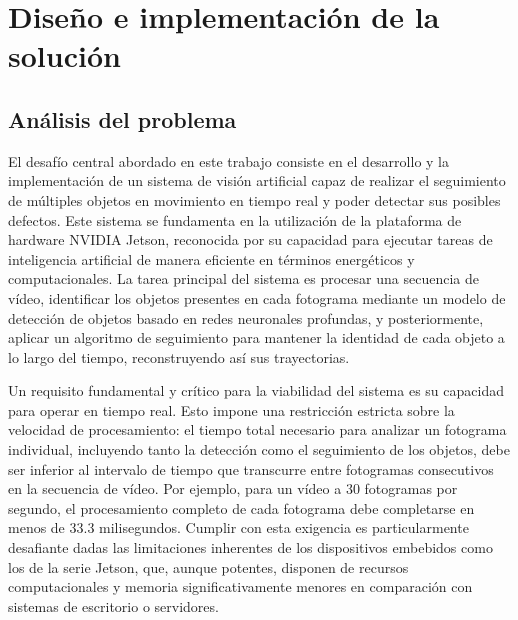 \documentclass[11pt,spanish,listoffigures,listoftables]{tfgetsinf}
\begin{document}




\chapter{Diseño e implementación de la solución} \label{chap:diseno_e_implementacion}

\section{Análisis del problema} \label{sec:analisis_problema}

El desafío central abordado en este trabajo consiste en el desarrollo y la implementación de un sistema de visión artificial capaz de realizar el seguimiento de múltiples objetos en movimiento en tiempo real y poder detectar sus posibles defectos. Este sistema se fundamenta en la utilización de la plataforma de hardware NVIDIA Jetson, reconocida por su capacidad para ejecutar tareas de inteligencia artificial de manera eficiente en términos energéticos y computacionales. La tarea principal del sistema es procesar una secuencia de vídeo, identificar los objetos presentes en cada fotograma mediante un modelo de detección de objetos basado en redes neuronales profundas, y posteriormente, aplicar un algoritmo de seguimiento para mantener la identidad de cada objeto a lo largo del tiempo, reconstruyendo así sus trayectorias.

Un requisito fundamental y crítico para la viabilidad del sistema es su capacidad para operar en tiempo real. Esto impone una restricción estricta sobre la velocidad de procesamiento: el tiempo total necesario para analizar un fotograma individual, incluyendo tanto la detección como el seguimiento de los objetos, debe ser inferior al intervalo de tiempo que transcurre entre fotogramas consecutivos en la secuencia de vídeo. Por ejemplo, para un vídeo a 30 fotogramas por segundo, el procesamiento completo de cada fotograma debe completarse en menos de 33.3 milisegundos. Cumplir con esta exigencia es particularmente desafiante dadas las limitaciones inherentes de los dispositivos embebidos como los de la serie Jetson, que, aunque potentes, disponen de recursos computacionales y memoria significativamente menores en comparación con sistemas de escritorio o servidores.
\end{document}
